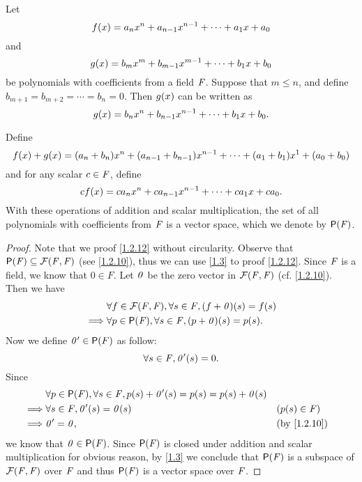 \begin{eg}\label{1.2.12}
	Let
	\[
		f\p{x} = a_{n} x^{n} + a_{n - 1} x^{n - 1} + \cdots + a_{1} x + a_{0}
	\]
	and
	\[
		g\p{x} = b_{m} x^{m} + b_{m - 1} x^{m - 1} + \cdots + b_{1} x + b_{0}
	\]
	be polynomials with coefficients from a field \(\mathit{F}\).
	Suppose that \(m \leq n\), and define \(b_{m + 1} = b_{m + 2} = \cdots = b_{n} = 0\).
	Then \(g\p{x}\) can be written as
	\[
		g\p{x} = b_{n} x^{n} + b_{n - 1} x^{n - 1} + \cdots + b_{1} x + b_{0}.
	\]

	Define
	\[
		f\p{x} + g\p{x} = \p{a_{n} + b_{n}} x^{n} + \p{a_{n - 1} + b_{n - 1}} x^{n - 1} + \cdots + \p{a_{1} + b_{1}} x^{1} + \p{a_{0} + b_{0}}
	\]
	and for any scalar \(c \in \mathit{F}\), define
	\[
		cf\p{x} = ca_{n} x^{n} + ca_{n - 1} x^{n - 1} + \cdots + ca_{1} x + ca_{0}.
	\]
	With these operations of addition and scalar multiplication, the set of all polynomials with coefficients from \(\mathit{F}\) is a vector space, which we denote by \(\ps{\F}\).
\end{eg}

\begin{proof}
	Note that we proof \cref{1.2.12} without circularity.
	Observe that \(\ps{\F} \subseteq \fs{\F}{\F}\) (see \cref{1.2.10}), thus we can use \cref{1.3} to proof \cref{1.2.12}.
	Since \(\mathit{F}\) is a field, we know that \(0 \in F\).
	Let \(\mathit{0}\) be the zero vector in \(\fs{\F}{\F}\) (cf. \cref{1.2.10}).
	Then we have
	\begin{align*}
		         & \forall f \in \fs{\F}{\F}, \forall s \in \F, \p{f + \zv}\p{s} = f\p{s} \\
		\implies & \forall p \in \ps{\F}, \forall s \in \F, \p{p + \zv}\p{s} = p\p{s}.
	\end{align*}
	Now we define \(\zv' \in \ps{F}\) as follow:
	\[
		\forall s \in \F, \zv'\p{s} = 0.
	\]
	Since
	\begin{align*}
		         & \forall p \in \ps{\F}, \forall s \in \F, p\p{s} + \zv'\p{s} = p\p{s} = p\p{s} + \zv\p{s}                                \\
		\implies & \forall s \in \F, \zv'\p{s} = \zv\p{s}                                                   &  & (p\p{s} \in \F)           \\
		\implies & \zv' = \zv,                                                                              &  & \text{(by \cref{1.2.10})}
	\end{align*}
	we know that \(\zv \in \ps{\F}\).
	Since \(\ps{\F}\) is closed under addition and scalar multiplication for obvious reason, by \cref{1.3} we conclude that \(\ps{\F}\) is a subspace of \(\fs{\F}{\F}\) over \(\mathit{F}\) and thus \(\ps{\F}\) is a vector space over \(\mathit{F}\).
\end{proof}

